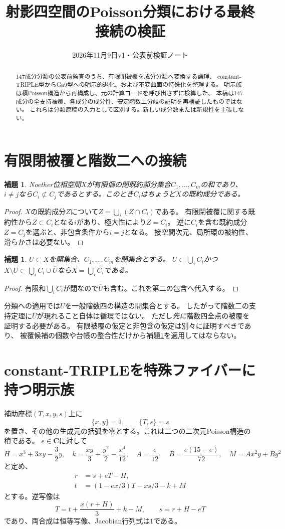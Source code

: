 \documentclass[a4paper,11pt]{ltjsarticle}
\title{射影四空間のPoisson分類における最終接続の検証}
\author{}
\date{2026年11月9日\quad v1・公表前検証ノート}
\newtheorem{lemma}[proposition]{補題}
\theoremstyle{remark}\newtheorem{remark}[proposition]{注意}
\newcommand{\CC}{\mathbf C}
\begin{document}
\maketitle
\begin{abstract}
147成分分類の公表前監査のうち、有限閉被覆を成分分類へ変換する論理、
constant-TRIPLE型からGa9型への明示的退化、および不変曲面の特殊化を整理する。
明示族は積Poisson構造から再構成し、元の計算コードを呼び出さずに検算した。
本稿は147成分の全支持被覆、各成分の成分性、安定階数二分岐の証明を再検証したものではない。
これらは分類原稿の入力として区別する。新しい成分数または新規性を主張しない。
\end{abstract}

\section{有限閉被覆と階数二への接続}
\begin{lemma}\label{lem:cover}
Noether位相空間$X$が有限個の閉既約部分集合$C_1,\ldots,C_m$の和であり、
$i\ne j$なら$C_i\not\subset C_j$であるとする。このとき$C_i$はちょうど$X$の既約成分である。
\end{lemma}
\begin{proof}
$X$の既約成分$Z$について$Z=\bigcup_i(Z\cap C_i)$である。
有限閉被覆に関する既約性から$Z\subset C_i$となる$i$があり、極大性により$Z=C_i$。
逆に$C_i$を含む既約成分$Z=C_j$を選ぶと、非包含条件から$i=j$となる。
接空間次元、局所環の被約性、滑らかさは必要ない。
\end{proof}

\begin{lemma}\label{lem:rank}
$U\subset X$を開集合、$C_1,\ldots,C_m$を閉集合とする。
$U\subset\bigcup_iC_i$かつ
$X\setminus U\subset\bigcup_iC_i\cup\overline U$なら$X=\bigcup_iC_i$である。
\end{lemma}
\begin{proof}
有限和$\bigcup_iC_i$が閉なので$\overline U$も含む。これを第二の包含へ代入する。
\end{proof}

分類への適用では$U$を一般階数四の構造の開集合とする。
したがって階数二の支持定理に$\overline U$が現れること自体は循環ではない。
ただし\emph{先に}階数四全点の被覆を証明する必要がある。
有限被覆の仮定と非包含の仮定は別々に証明すべきであり、
被覆候補の個数や台帳の整合性だけから補題\ref{lem:cover}を適用してはならない。

\section{constant-TRIPLEを特殊ファイバーに持つ明示族}
補助座標$(T,x,y,s)$上に
\[
 \{x,y\}=1,\qquad \{T,s\}=s
\]
を置き、その他の生成元の括弧を零とする。これは二つの二次元Poisson構造の積である。
$e\in\CC$に対して
\[
 H=x^3+3xy-\frac32y,\quad k=\frac{xy}{3}+\frac{y^2}{2}-\frac{x^4}{12},
 \quad A=\frac e{12},\quad B=\frac{e(15-e)}{72},\quad M=Ax^2y+By^2
\]
と定め、
\begin{align*}
 r&=s+eT-H,\\
 t&=(1-ex/3)T-xs/3-k+M
\end{align*}
とする。逆写像は
\[
 T=t+\frac{x(r+H)}3+k-M,\qquad s=r+H-eT
\]
であり、両合成は恒等写像、Jacobian行列式は$1$である。
\end{document}
